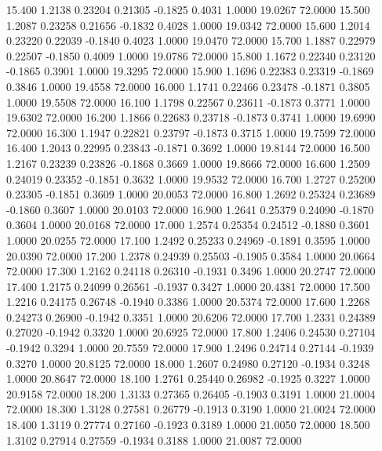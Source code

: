   15.400   1.2138   0.23204   0.21305  -0.1825   0.4031   1.0000  19.0267  72.0000
  15.500   1.2087   0.23258   0.21656  -0.1832   0.4028   1.0000  19.0342  72.0000
  15.600   1.2014   0.23220   0.22039  -0.1840   0.4023   1.0000  19.0470  72.0000
  15.700   1.1887   0.22979   0.22507  -0.1850   0.4009   1.0000  19.0786  72.0000
  15.800   1.1672   0.22340   0.23120  -0.1865   0.3901   1.0000  19.3295  72.0000
  15.900   1.1696   0.22383   0.23319  -0.1869   0.3846   1.0000  19.4558  72.0000
  16.000   1.1741   0.22466   0.23478  -0.1871   0.3805   1.0000  19.5508  72.0000
  16.100   1.1798   0.22567   0.23611  -0.1873   0.3771   1.0000  19.6302  72.0000
  16.200   1.1866   0.22683   0.23718  -0.1873   0.3741   1.0000  19.6990  72.0000
  16.300   1.1947   0.22821   0.23797  -0.1873   0.3715   1.0000  19.7599  72.0000
  16.400   1.2043   0.22995   0.23843  -0.1871   0.3692   1.0000  19.8144  72.0000
  16.500   1.2167   0.23239   0.23826  -0.1868   0.3669   1.0000  19.8666  72.0000
  16.600   1.2509   0.24019   0.23352  -0.1851   0.3632   1.0000  19.9532  72.0000
  16.700   1.2727   0.25200   0.23305  -0.1851   0.3609   1.0000  20.0053  72.0000
  16.800   1.2692   0.25324   0.23689  -0.1860   0.3607   1.0000  20.0103  72.0000
  16.900   1.2641   0.25379   0.24090  -0.1870   0.3604   1.0000  20.0168  72.0000
  17.000   1.2574   0.25354   0.24512  -0.1880   0.3601   1.0000  20.0255  72.0000
  17.100   1.2492   0.25233   0.24969  -0.1891   0.3595   1.0000  20.0390  72.0000
  17.200   1.2378   0.24939   0.25503  -0.1905   0.3584   1.0000  20.0664  72.0000
  17.300   1.2162   0.24118   0.26310  -0.1931   0.3496   1.0000  20.2747  72.0000
  17.400   1.2175   0.24099   0.26561  -0.1937   0.3427   1.0000  20.4381  72.0000
  17.500   1.2216   0.24175   0.26748  -0.1940   0.3386   1.0000  20.5374  72.0000
  17.600   1.2268   0.24273   0.26900  -0.1942   0.3351   1.0000  20.6206  72.0000
  17.700   1.2331   0.24389   0.27020  -0.1942   0.3320   1.0000  20.6925  72.0000
  17.800   1.2406   0.24530   0.27104  -0.1942   0.3294   1.0000  20.7559  72.0000
  17.900   1.2496   0.24714   0.27144  -0.1939   0.3270   1.0000  20.8125  72.0000
  18.000   1.2607   0.24980   0.27120  -0.1934   0.3248   1.0000  20.8647  72.0000
  18.100   1.2761   0.25440   0.26982  -0.1925   0.3227   1.0000  20.9158  72.0000
  18.200   1.3133   0.27365   0.26405  -0.1903   0.3191   1.0000  21.0004  72.0000
  18.300   1.3128   0.27581   0.26779  -0.1913   0.3190   1.0000  21.0024  72.0000
  18.400   1.3119   0.27774   0.27160  -0.1923   0.3189   1.0000  21.0050  72.0000
  18.500   1.3102   0.27914   0.27559  -0.1934   0.3188   1.0000  21.0087  72.0000
